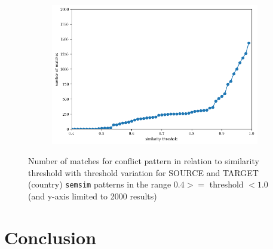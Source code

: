 \documentclass[11pt]{scrreprt}
\begin{document}
\begin{figure}
     \centering
     \begin{subfigure}[t]{0.9\textwidth}
         \includegraphics[width=\textwidth]{countries_20-most-popul_thresholds-countries_greater-0.4.png}
     \end{subfigure}
\caption{Number of matches for conflict pattern in relation to similarity threshold with threshold variation for \textsf{SOURCE} and \textsf{TARGET} (country) \texttt{semsim} patterns in the range \(0.4 >=\) threshold \(< 1.0\) (and y-axis limited to 2000 results)}
\label{fig:case-study-conflict-countries-2}   
\end{figure}


\chapter{Conclusion}




\printbibliography
\end{document}
